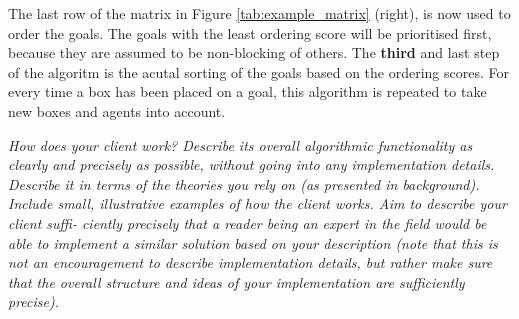 The last row of the matrix in Figure \ref{tab:example_matrix} (right), is now used to order the goals. The goals with the least ordering score will be prioritised first, because they are assumed to be non-blocking of others. The \textbf{third} and last step of the algoritm is the acutal sorting of the goals based on the ordering scores. For every time a box has been placed on a goal, this algorithm is repeated to take new boxes and agents into account. 

\emph{How does your client work? Describe its overall algorithmic functionality as clearly and precisely as possible, without going into any implementation details.  Describe it in terms of the theories you rely on (as presented in background). Include small, illustrative examples of how the client works. Aim to describe your client suffi- ciently precisely that a reader being an expert in the field would be able to implement a similar solution based on your description (note that this is not an encouragement to describe implementation details, but rather make sure that the overall structure and ideas of your implementation are sufficiently precise).}
